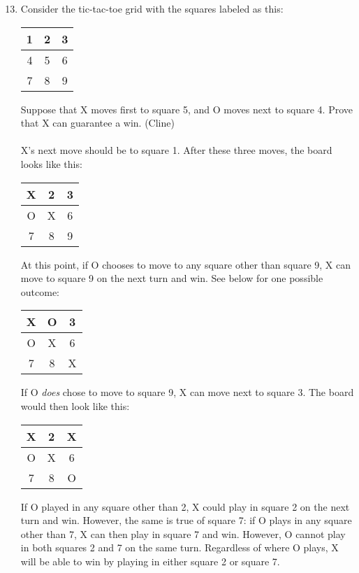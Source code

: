 \documentclass{article}
\begin{document}
\begin{enumerate}
    \setcounter{enumi}{12}
    \item Consider the tic-tac-toe grid with the squares labeled as this:
          \begin{center}
              \begin{tabular}{c|c|c}
                  1 & 2 & 3 \\
                  \hline
                  4 & 5 & 6 \\
                  \hline
                  7 & 8 & 9
              \end{tabular}
          \end{center}
          Suppose that X moves first to square 5, and O moves next to square 4. Prove that X can
          guarantee a win. (Cline)\\\\
          X's next move should be to square 1.
          After these three moves, the board looks like this:
          \begin{center}
            \begin{tabular}{c|c|c}
                X & 2 & 3 \\
                \hline
                O & X & 6 \\
                \hline
                7 & 8 & 9
            \end{tabular}
        \end{center}
         At this point, if O chooses to move to any square other than square 9, X can move to square 9 on the next turn and win. See below for one possible outcome:
         \begin{center}
            \begin{tabular}{c|c|c}
                X & O & 3 \\
                \hline
                O & X & 6 \\
                \hline
                7 & 8 & X
            \end{tabular}
        \end{center}
         If O \textit{does} chose to move to square 9, X can move next to square 3. The board would then look like this:
         \begin{center}
            \begin{tabular}{c|c|c}
                X & 2 & X \\
                \hline
                O & X & 6 \\
                \hline
                7 & 8 & O
            \end{tabular}
        \end{center}
        If O played in any square other than 2, X could play in square 2 on the next turn and win. However, the same is true of square 7: if O plays in any square other than 7, X can then play in square 7 and win. 
        However, O cannot play in both squares 2 and 7 on the same turn. Regardless of where O plays, X will be able to win by playing in either square 2 or square 7. 
        
\end{enumerate}
\end{document}
